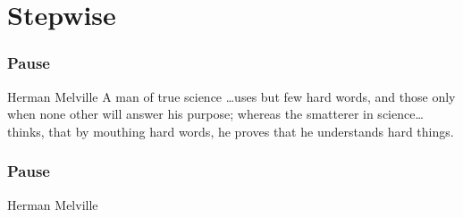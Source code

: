 \documentclass[11pt]{beamer}
\begin{document}
\section[Stepwise]{Stepwise}

\begin{frame}
  \frametitle{Pause}
  \begin{block}{Herman Melville}
    A man of true science \ldots \pause uses but few hard words,
    \pause and those only when none other will answer his
    purpose; \pause whereas the smatterer in science\ldots
    \pause thinks, that by mouthing hard words, he proves that
    he understands hard things.
  \end{block}
\end{frame}

\begin{frame}
  \frametitle{Pause}
  \begin{exampleblock}{Herman Melville}
  \end{exampleblock}
\end{frame}


  
\end{document}
